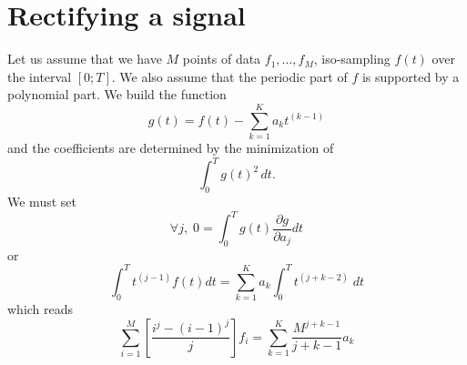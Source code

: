 \documentclass[aps,twocolumn]{revtex4}
\begin{document}
\section{Rectifying a signal}
Let us assume that we have $M$ points of data $f_1,\ldots,f_M$, iso-sampling $f(t)$ over the interval $[0;T]$.
We also assume that the periodic part of $f$ is supported by a polynomial part.
We build the function
\begin{equation}
	g(t) = f(t) - \sum_{k=1}^K a_k t^{(k-1)}
\end{equation}
and the coefficients are determined by the minimization of
\begin{equation}
\int_0^T g(t)^2\,dt.
\end{equation}
We must set
\begin{equation}
	\forall j,\; 0 = \int_0^T g(t)\dfrac{\partial g}{\partial a_j} dt
\end{equation}
or
\begin{equation}
	\int_0^T t^{(j-1)} f(t) dt = \sum_{k=1}^K a_k \int_{0}^T t^{(j+k-2)} \; dt 
\end{equation}
which reads
\begin{equation}
	\sum_{i=1}^M 
	\left\lbrack 
	\dfrac{i^j - (i-1)^{j}}{j}	\right\rbrack
 f_i = \sum_{k=1}^K \dfrac{M^{j+k-1}}{j+k-1} a_k
\end{equation}
\end{document}

